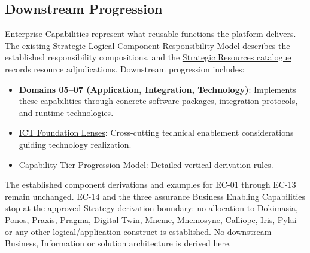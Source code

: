 \par\smallskip
{}\label{rad:enterprise:317}
\subsection*{Downstream Progression}
\label{rad:enterprise:319}

Enterprise Capabilities represent what reusable functions the platform delivers. The existing \href{https://github.com/fhirfactory/harmonia/blob/98410db60155198a75f74c79d98060070209faa1/docs/markdown/02-strategy/strategic-views/logical-component-responsibilities.md}{Strategic Logical Component Responsibility Model} describes the established responsibility compositions, and the \href{https://github.com/fhirfactory/harmonia/blob/98410db60155198a75f74c79d98060070209faa1/docs/markdown/02-strategy/resources/strategic-resources.md}{Strategic Resources catalogue} records resource adjudications. Downstream progression includes:

\label{rad:enterprise:320}

\begin{itemize}

\item
\textbf{Domains 05–07 (Application, Integration, Technology)}: Implements these capabilities through concrete software packages, integration protocols, and runtime technologies.



\item
\href{https://github.com/fhirfactory/harmonia/blob/98410db60155198a75f74c79d98060070209faa1/docs/markdown/02-strategy/capabilities/ict-foundation-lenses.md}{ICT Foundation Lenses}: Cross-cutting technical enablement considerations guiding technology realization.



\item
\hyperref[rad:tier-model]{Capability Tier Progression Model}: Detailed vertical derivation rules.



\end{itemize}
\label{rad:enterprise:324}

The established component derivations and examples for EC-01 through EC-13 remain unchanged. EC-14 and the three assurance Business Enabling Capabilities stop at the \hyperref[rad:assurance-strategy:88]{approved Strategy derivation boundary}: no allocation to Dokimasia, Ponos, Praxis, Pragma, Digital Twin, Mneme, Mnemosyne, Calliope, Iris, Pylai or any other logical/\allowbreak{}application construct is established. No downstream Business, Information or solution architecture is derived here.

